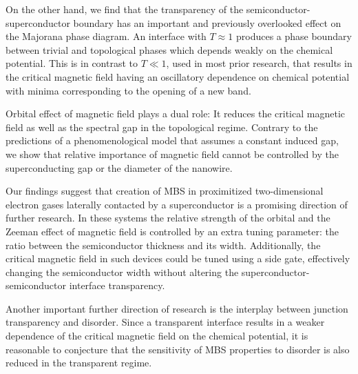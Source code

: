 \documentclass[twocolumn, notitlepage, 10pt, aps, floatfix, showpacs, prb, citeautoscript]{revtex4-1}
\newcommand{\comment}[1]{}
\begin{document}
\comment{High interface transparency is advantageous.}
On the other hand, we find that the transparency of the semiconductor-superconductor boundary has an important and previously overlooked effect on the Majorana phase diagram.
An interface with $T \approx 1$ produces a phase boundary between trivial and topological phases which depends weakly on the chemical potential.
This is in contrast to $T \ll 1$, used in most prior research, that results in the critical magnetic field having an oscillatory dependence on chemical potential with minima corresponding to the opening of a new band.

\comment{Orbital effect of magnetic field cannot be avoided by superconductor choice or tuning system size.}
Orbital effect of magnetic field plays a dual role: It reduces the critical magnetic field as well as the spectral gap in the topological regime.
Contrary to the predictions of a phenomenological model that assumes a constant induced gap, we show that relative importance of magnetic field cannot be controlled by the superconducting gap or the diameter of the nanowire.

\comment{2DEGs are probably best for Majoranas}
Our findings suggest that creation of MBS in proximitized two-dimensional electron gases laterally contacted by a superconductor is a promising direction of further research.
In these systems the relative strength of the orbital and the Zeeman effect of magnetic field is controlled by an extra tuning parameter: the ratio between the semiconductor thickness and its width.
Additionally, the critical magnetic field in such devices could be tuned using a side gate, effectively changing the semiconductor width without altering the superconductor-semiconductor interface transparency.

\comment{Insensitivity to chemical potential could mean insensitivity to disorder.}
Another important further direction of research is the interplay between junction transparency and disorder.
Since a transparent interface results in a weaker dependence of the critical magnetic field on the chemical potential, it is reasonable to conjecture that the sensitivity of MBS properties to disorder is also reduced in the transparent regime.

\end{document}
